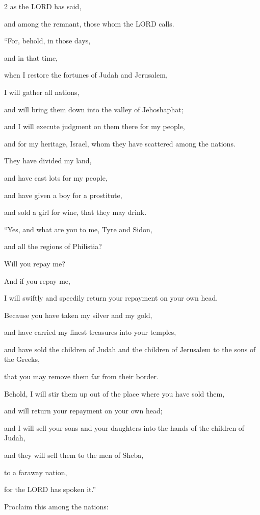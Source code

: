 \begin{multicols}{2}
as the LORD has said,

and among the remnant, those whom the LORD calls.

\mychapter{} \myverse*{}“For, behold, in those days,

and in that time,

when I restore the fortunes of Judah and Jerusalem,

\myverse{}I will gather all nations,

and will bring them down into the valley of Jehoshaphat;

and I will execute judgment on them there for my people,

and for my heritage, Israel, whom they have scattered among the nations.

They have divided my land,

\myverse{}and have cast lots for my people,

and have given a boy for a prostitute,

and sold a girl for wine, that they may drink.


\vspace{\baselineskip} 
\myverse{}“Yes, and what are you to me, Tyre and Sidon,

and all the regions of Philistia?

Will you repay me?

And if you repay me,

I will swiftly and speedily return your repayment on your own head.

\myverse{}Because you have taken my silver and my gold,

and have carried my finest treasures into your temples,

\myverse{}and have sold the children of Judah and the children
of Jerusalem to the sons of the Greeks,

that you may remove them far from their border.

\myverse{}Behold, I will stir them up out of the place where you have sold
them,

and will return your repayment on your own head;

\myverse{}and I will sell your sons and your daughters into the hands of
the children of Judah,

and they will sell them to the men of Sheba,

to a faraway nation,

for the LORD has spoken it.”


\vspace{\baselineskip} 
\myverse{}Proclaim this among the nations:


\end{multicols}
